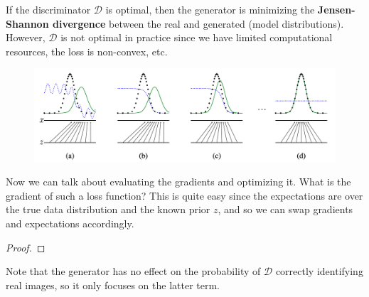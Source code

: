 \documentclass{article}
\begin{document}
  If the discriminator $\mathcal{D}$ is optimal, then the generator is minimizing the \textbf{Jensen-Shannon divergence} between the real and generated (model distributions). However, $\mathcal{D}$ is not optimal in practice since we have limited computational resources, the loss is non-convex, etc. 

  \begin{figure}[H]
    \centering 
    \includegraphics[scale=0.3]{img/equil.png}
    \caption{} 
    \label{fig:nash_equilibrium}
  \end{figure}

  Now we can talk about evaluating the gradients and optimizing it. What is the gradient of such a loss function? This is quite easy since the expectations are over the true data distribution and the known prior $z$, and so we can swap gradients and expectations accordingly. 

  \begin{lemma}
    
  \end{lemma} 
  \begin{proof}
    
  \end{proof}

  Note that the generator has no effect on the probability of $\mathcal{D}$ correctly identifying real images, so it only focuses on the latter term. 
\end{document}
